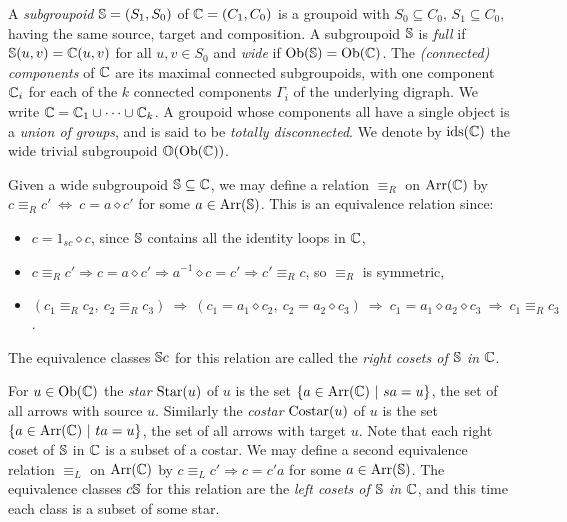 \medskip {} 
A \emph{subgroupoid} $\mathbb{S}=(S_1,S_0)$ of $\mathbb{C}=(C_1,C_0)$ 
is a groupoid with $S_0 \subseteq C_0$, $S_1 \subseteq C_0$, 
having the same source, target and composition. 
A subgroupoid $\mathbb{S}$ is \emph{full}  
if $\mathbb{S}(u,v) = \mathbb{C}(u,v)$ for all $u,v \in S_0$ 
and \emph{wide}  
if $\mathrm{Ob}(\mathbb{S}) = \mathrm{Ob}(\mathbb{C})$. 
The \emph{(connected) components} of $\mathbb{C}$ are its maximal 
connected subgroupoids,  
with one component $\mathbb{C}_i$ for each of the $k$ connected components 
$\Gamma_i$ of the underlying digraph. 
We write $\mathbb{C} = \mathbb{C}_1 \cup \cdots \cup \mathbb{C}_k$.  
A groupoid whose components all have a single object is a 
\emph{union of groups},  
and is said to be \emph{totally disconnected}. 
We denote by $\mathrm{ids}(\mathbb{C})$ the wide trivial subgroupoid $\mathbb{O}(\mathrm{Ob}(\mathbb{C}))$. 

\medskip
Given a wide subgroupoid $\mathbb{S} \subseteq \mathbb{C}$, 
we may define a relation $\equiv_R$ on $\mathrm{Arr}(\mathbb{C})$ by 
$c \equiv_R c' ~\Leftrightarrow~ c = a \diamond c'$ 
for some $a \in \mathrm{Arr}(\mathbb{S})$. 
This is an equivalence relation since: 
\begin{itemize}
\item
$c = 1_{sc} \diamond c$, since $\mathbb{S}$ contains 
all the identity loops in $\mathbb{C}$,  
\item
$c \equiv_R c' \Rightarrow c=a \diamond c' \Rightarrow a^{-1}\diamond c=c' 
               \Rightarrow c' \equiv_R c$, so $\equiv_R$ is symmetric, 
\item
$(c_1 \equiv_R c_2,~ c_2 \equiv_R c_3) 
 ~\Rightarrow~ (c_1=a_1 \diamond c_2,~ c_2=a_2 \diamond c_3) 
 ~\Rightarrow~ c_1=a_1 \diamond a_2 \diamond c_3 
 ~\Rightarrow~ c_1 \equiv_R c_3$. 
\end{itemize} 
The equivalence classes $\mathbb{S} c$ for this relation are called the 
\emph{right cosets of $\mathbb{S}$ in $\mathbb{C}$}. 

\medskip
For $u \in \mathrm{Ob}(\mathbb{C})$ the \emph{star} $\mathrm{Star}(u)$ of $u$ is the set 
$\{a \in \mathrm{Arr}(\mathbb{C}) ~|~ sa=u\}$, the set of all arrows with source $u$. 
Similarly the \emph{costar} $\mathrm{Costar}(u)$ of $u$ is the set 
$\{a \in \mathrm{Arr}(\mathbb{C}) ~|~ ta=u\}$, the set of all arrows with target $u$.
Note that each right coset of $\mathbb{S}$ in $\mathbb{C}$ is a subset of a costar. 
We may define a second equivalence relation $\equiv_L$ on $\mathrm{Arr}(\mathbb{C})$ by 
$c \equiv_L c' \Rightarrow c = c'a$ for some $a \in \mathrm{Arr}(\mathbb{S})$. 
The equivalence classes $c\mathbb{S}$ for this relation are the 
\emph{left cosets of $\mathbb{S}$ in $\mathbb{C}$}, 
and this time each class is a subset of some star. 

